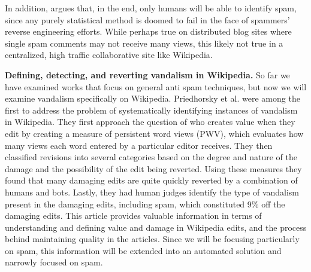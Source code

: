 \documentclass[letterpaper]{sig-alternate}
\begin{document}
In addition, \cite{Han06collaborativeblog} argues that, in the end, only humans will be able to identify spam, since any purely statistical method is doomed to fail in the face of spammers' reverse engineering efforts. While perhaps true on distributed blog sites where single spam comments may not receive many views, this likely not true in a centralized, high traffic collaborative site like Wikipedia.

\textbf{Defining, detecting, and reverting vandalism in Wikipedia.} So far we have examined works that focus on general anti spam techniques, but now we will examine vandalism specifically on Wikipedia. Priedhorsky et al. \cite{create_destroy_restore} were among the first to address the problem of systematically identifying instances of vandalism in Wikipedia. They first approach the question of who creates value when they edit by creating a measure of persistent word views (PWV), which evaluates how many views each word entered by a particular editor receives. They then classified revisions into several categories based on the degree and nature of the damage and the possibility of the edit being reverted. Using these measures they found that many damaging edits are quite quickly reverted by a combination of humans and bots. Lastly, they had human judges identify the type of vandalism present in the damaging edits, including spam, which constituted 9\% off the damaging edits. This article provides valuable information in terms of understanding and defining value and damage in Wikipedia edits, and the process behind maintaining quality in the articles. Since we will be focusing particularly on spam, this information will be extended into an automated solution and narrowly focused on spam.
\end{document}
